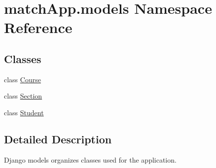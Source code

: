 \hypertarget{namespacematch_app_1_1models}{}\section{match\+App.\+models Namespace Reference}
\label{namespacematch_app_1_1models}
\subsection*{Classes}
\begin{DoxyCompactItemize}
\item 
class \hyperlink{classmatch_app_1_1models_1_1_course}{Course}
\item 
class \hyperlink{classmatch_app_1_1models_1_1_section}{Section}
\item 
class \hyperlink{classmatch_app_1_1models_1_1_student}{Student}
\end{DoxyCompactItemize}


\subsection{Detailed Description}
\begin{DoxyVerb}Django models organizes classes used for the application. 
\end{DoxyVerb}
 